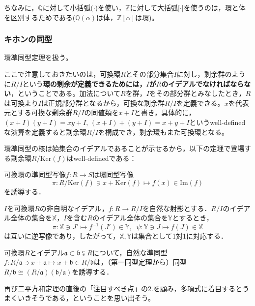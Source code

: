 ちなみに，$\mathbb{Q}$に対して小括弧($\cdot$)を使い，$\mathbb{Z}$に対して大括弧[$\cdot$]を使うのは，環と体を区別するためである($\mathbb{Q}(\alpha)$は体，$\mathbb{Z}[\alpha]$は環)。

\subsubsection{キホンの同型}
環準同型定理を扱う。

ここで注意しておきたいのは，可換環$R$とその部分集合$I$に対し，剰余群のように$R/I$という\textbf{環の剰余が定義できるためには，$I$が$R$のイデアルでなければならない}，ということである。加法について$R$を群，$I$をその部分群とみなしたとき，$R$は可換より$I$は正規部分群となるから，可換な剰余群$R/I$を定義できる。$x$を代表元とする可換な剰余群$R/I$の同値類を$x+I$と書き，具体的に，$(x+I)(y+I)=xy+I,\, (x+I)+(y+I)=x+y+I$というwell-definedな演算を定義すると剰余環$R/I$を構成でき，剰余環もまた可換環となる。

環準同型の核は始集合のイデアルであることが示せるから，以下の定理で登場する剰余環$R/{\mathrm{Ker}(f)}$はwell-definedである：

\begin{thm}[環の第一同型定理]
    可換環の準同型写像$f:R\rightarrow S$は環同型写像\[
    \pi:R/\mathrm{Ker}(f)\ni x+\mathrm{Ker}(f)\mapsto f(x)\in\mathrm{Im}(f)
    \]を誘導する．
\end{thm}

\begin{thm}[イデアルの対応定理]
    $I$を可換環$R$の非自明なイデアル，$f:R\rightarrow R/I$を自然な射影とする．$R/I$のイデアル全体の集合を$\mathbb{X}$，$I$を含む$R$のイデアル全体の集合を$\mathbb{Y}$とするとき，\[
    \pi:\mathbb{X}\ni J'\mapsto f^{-1}(J')\in\mathbb{Y},\;\; \psi:\mathbb{Y}\ni J\mapsto f(J)\in\mathbb{X}
    \]は互いに逆写像であり，したがって，$\mathbb{X,Y}$は集合として1対1に対応する．
\end{thm}

\begin{thm}[環の第三同型定理]
    可換環$R$とイデアル$\mathfrak{a}\subset\mathfrak{b}\subsetneqq R$について，自然な準同型$f:R/{\mathfrak{a}}\ni x+\mathfrak{a}\mapsto x+\mathfrak{b}\in R/{\mathfrak{b}}$は，（第一同型定理から）同型$R/{\mathfrak{b}}\cong (R/{\mathfrak{a}})(\mathfrak{b}/{\mathfrak{a}})$を誘導する．
\end{thm}

再び二平方和定理の直後の「注目すべき点」の2.を顧み，多項式に着目するとうまくいきそうである，ということを思い出そう。

